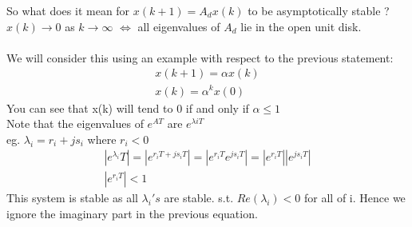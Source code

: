 \documentclass[a4paper,11pt]{article}
\begin{document}
	So what does it mean for $x(k+1) = A_d x(k)$ to be asymptotically stable ?\\
	$x(k)\rightarrow 0$ as $k\rightarrow \infty$ $\Longleftrightarrow$ all eigenvalues of $A_d$ lie in the open unit disk.\\\\
	We will consider this using an example with respect to the previous statement: \\
	\begin{gather}
	x(k+1)=\alpha x(k)\\
	x(k) = \alpha^{k} x(0)
	\end{gather}
	You can see that x(k) will tend to 0 if and only if $\alpha \leq 1$\\
	Note that the eigenvalues of $e^{AT}$ are $e^{\lambda i T}$\\  
	eg. $\lambda_i = r_i+j s_i$ where $r_i < 0$
	\begin{gather}
		|e^{\lambda_i}T|= |e^{r_iT+js_iT}| = |e^{r_iT}e^{js_iT}| = |e^{r_iT}||e^{js_iT}|\\
		|e^{r_iT}| < 1
	\end{gather}
	This system is stable as all $\lambda_i's$ are stable. s.t. $Re(\lambda_i)< 0$ for all of i. Hence we ignore the imaginary part in the previous equation.
\end{document}
